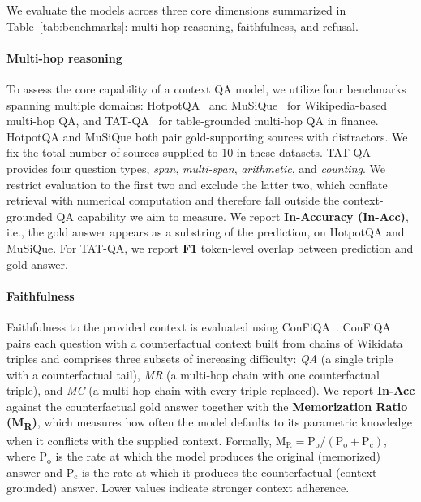 \documentclass{article}
\begin{document}
We evaluate the models across three core dimensions summarized in Table~\ref{tab:benchmarks}: multi-hop reasoning, faithfulness, and refusal. 

\paragraph{Multi-hop reasoning} To assess the core capability of a context QA model, we utilize four benchmarks spanning multiple domains: HotpotQA~\citep{hotpotqa} and MuSiQue~\citep{musique} for Wikipedia-based multi-hop QA, and TAT-QA~\citep{tat-qa} for table-grounded multi-hop QA in finance. HotpotQA and MuSiQue both pair gold-supporting sources with distractors. We fix the total number of sources supplied to 10 in these datasets. TAT-QA provides four question types, \textit{span}, \textit{multi-span}, \textit{arithmetic}, and \textit{counting}. We restrict evaluation to the first two and exclude the latter two, which conflate retrieval with numerical computation and therefore fall outside the context-grounded QA capability we aim to measure. We report \textbf{In-Accuracy (In-Acc)}, i.e., the gold answer appears as a substring of the prediction, on HotpotQA and MuSiQue. For TAT-QA, we report \textbf{F1} token-level overlap between prediction and gold answer.

\paragraph{Faithfulness} Faithfulness to the provided context is evaluated using ConFiQA~\citep{bi-etal-2025-context}. ConFiQA pairs each question with a counterfactual context built from chains of Wikidata triples and comprises three subsets of increasing difficulty: \textit{QA} (a single triple with a counterfactual tail), \textit{MR} (a multi-hop chain with one counterfactual triple), and \textit{MC} (a multi-hop chain with every triple replaced). We report \textbf{In-Acc} against the counterfactual gold answer together with the \textbf{Memorization Ratio (M\textsubscript{R})}, which measures how often the model defaults to its parametric knowledge when it conflicts with the supplied context. Formally, $\text{M}_\text{R} = \text{P}_\text{o} / (\text{P}_\text{o} + \text{P}_\text{c})$, where $\text{P}_\text{o}$ is the rate at which the model produces the original (memorized) answer and $\text{P}_\text{c}$ is the rate at which it produces the counterfactual (context-grounded) answer. Lower values indicate stronger context adherence.
\end{document}
